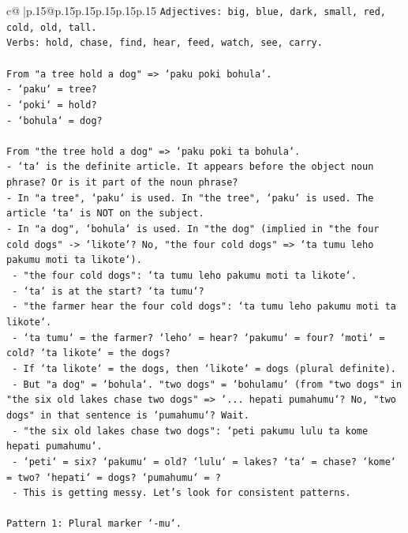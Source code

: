 \documentclass{article}
\begin{document}
{\begin{supertabular}{c@{$\;$}|p{.15\linewidth}@{}p{.15\linewidth}p{.15\linewidth}p{.15\linewidth}p{.15\linewidth}p{.15\linewidth}}
{{{\texttt{Adjectives: big, blue, dark, small, red, cold, old, tall.} \\
\texttt{Verbs: hold, chase, find, hear, feed, watch, see, carry.} \\
\\ 
\texttt{From "a tree hold a dog" => `paku poki bohula`.} \\
\texttt{{-} `paku` = tree?} \\
\texttt{{-} `poki` = hold?} \\
\texttt{{-} `bohula` = dog?} \\
\\ 
\texttt{From "the tree hold a dog" => `paku poki ta bohula`.} \\
\texttt{{-} `ta` is the definite article. It appears before the object noun phrase? Or is it part of the noun phrase?} \\
\texttt{{-} In "a tree", `paku` is used. In "the tree", `paku` is used. The article `ta` is NOT on the subject.} \\
\texttt{{-} In "a dog", `bohula` is used. In "the dog" (implied in "the four cold dogs" {-}> `likote`? No, "the four cold dogs" => `ta tumu leho pakumu moti ta likote`).} \\
\texttt{  {-} "the four cold dogs": `ta tumu leho pakumu moti ta likote`.} \\
\texttt{  {-} `ta` is at the start? `ta tumu`?} \\
\texttt{  {-} "the farmer hear the four cold dogs": `ta tumu leho pakumu moti ta likote`.} \\
\texttt{  {-} `ta tumu` = the farmer? `leho` = hear? `pakumu` = four? `moti` = cold? `ta likote` = the dogs?} \\
\texttt{  {-} If `ta likote` = the dogs, then `likote` = dogs (plural definite).} \\
\texttt{  {-} But "a dog" = `bohula`. "two dogs" = `bohulamu` (from "two dogs" in "the six old lakes chase two dogs" => `... hepati pumahumu`? No, "two dogs" in that sentence is `pumahumu`? Wait.} \\
\texttt{  {-} "the six old lakes chase two dogs": `peti pakumu lulu ta kome hepati pumahumu`.} \\
\texttt{  {-} `peti` = six? `pakumu` = old? `lulu` = lakes? `ta` = chase? `kome` = two? `hepati` = dogs? `pumahumu` = ?} \\
\texttt{  {-} This is getting messy. Let's look for consistent patterns.} \\
\\ 
\texttt{Pattern 1: Plural marker `{-}mu`.} \\
}}}
\end{supertabular}}
\end{document}
